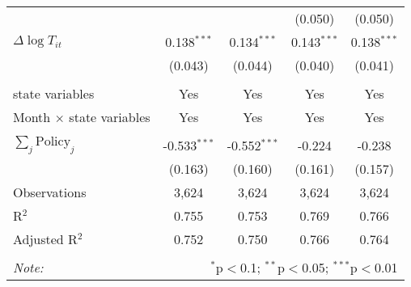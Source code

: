 \begin{tabular}{@{\extracolsep{1pt}}lcccc}
  &  &  & (0.050) & (0.050) \\ 
  $\Delta \log T_{it}$ & 0.138$^{***}$ & 0.134$^{***}$ & 0.143$^{***}$ & 0.138$^{***}$ \\ 
  & (0.043) & (0.044) & (0.040) & (0.041) \\ 
 \hline \\[-1.8ex] 
state variables & Yes & Yes & Yes & Yes \\ 
Month $\times$ state variables & Yes & Yes & Yes & Yes \\ 
\hline \\[-1.8ex] 
$\sum_j \mathrm{Policy}_j$ & -0.533$^{***}$ & -0.552$^{***}$ & -0.224 & -0.238 \\ 
 & (0.163) & (0.160) & (0.161) & (0.157) \\ 
Observations & 3,624 & 3,624 & 3,624 & 3,624 \\ 
R$^{2}$ & 0.755 & 0.753 & 0.769 & 0.766 \\ 
Adjusted R$^{2}$ & 0.752 & 0.750 & 0.766 & 0.764 \\ 
\hline 
\hline \\[-1.8ex] 
\textit{Note:}  & \multicolumn{4}{r}{$^{*}$p$<$0.1; $^{**}$p$<$0.05; $^{***}$p$<$0.01} \\ 
\end{tabular} 